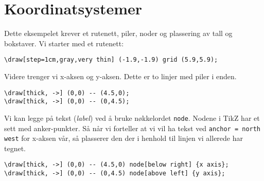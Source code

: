 \documentclass[12pt, a4paper]{article}
\begin{document}
\section{Koordinatsystemer}
Dette eksempelet krever et rutenett, piler, noder og plassering av tall og bokstaver. Vi starter med et rutenett:

\begin{center}
\end{center}

\begin{Verbatim}[fontsize=\small]
\draw[step=1cm,gray,very thin] (-1.9,-1.9) grid (5.9,5.9);
\end{Verbatim}

\noindent Videre trenger vi x-aksen og y-aksen. Dette er to linjer med piler i enden.
\begin{center}
\end{center}

\begin{Verbatim}[fontsize=\small]
\draw[thick, ->] (0,0) -- (4.5,0);
\draw[thick, ->] (0,0) -- (0,4.5);
\end{Verbatim}
\newpage

Vi kan legge på tekst (\textit{label}) ved å bruke nøkkelordet \texttt{node}. Nodene i TikZ har et sett med anker-punkter. Så når vi forteller at vi vil ha tekst ved \texttt{anchor = north west} for x-aksen vår, så plasserer den der i henhold til linjen vi allerede har tegnet.

\begin{center}
\end{center}

\begin{Verbatim}[fontsize=\small]
\draw[thick, ->] (0,0) -- (4.5,0) node[below right] {x axis};
\draw[thick, ->] (0,0) -- (0,4.5) node[above left] {y axis};
\end{Verbatim}
\end{document}
